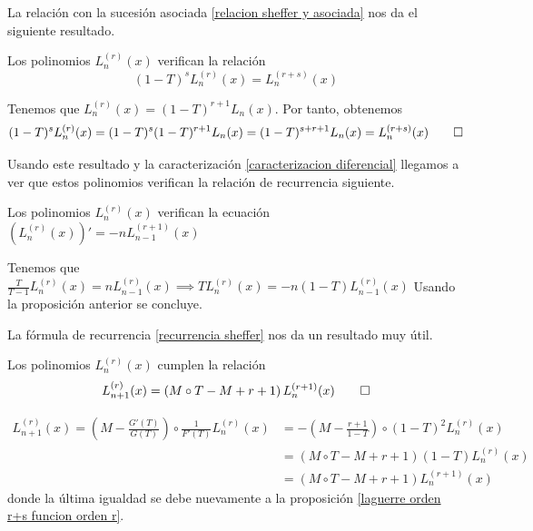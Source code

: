 La relación con la sucesión asociada \ref{relacion sheffer y asociada} nos da el siguiente resultado.

\begin{proposicion} \label{laguerre orden r+s funcion orden r}
    Los polinomios $L_n^{(r)}(x)$ verifican la relación \begin{equation*}
        (1-T)^s L_n^{(r)}(x) = L_n^{(r + s)}(x)
    \end{equation*}
\end{proposicion}

\begin{demo}
    Tenemos que $L_n^{(r)}(x) = (1-T)^{r+1} L_n(x)$. Por tanto, obtenemos
    \begin{equation*}
        (1-T)^s L_n^{(r)}(x) = (1-T)^s(1-T)^{r+1} L_n(x) = (1-T)^{s+r+1} L_n(x) = L_n^{(r + s)}(x) \qedhere
    \end{equation*}
\end{demo}

Usando este resultado y la caracterización \ref{caracterizacion diferencial} llegamos a ver que estos polinomios verifican la relación de recurrencia siguiente.

\begin{proposicion} \label{recurrencia diferencial laguerre}
    Los polinomios $L_n^{(r)}(x)$ verifican la ecuación $(L_n^{(r)}(x))' = -n L_{n-1}^{(r+1)}(x)$
\end{proposicion}

\begin{demo} Tenemos que $\frac{T}{T-1} L_n^{(r)}(x) = n L_{n-1}^{(r)}(x) \implies T L_n^{(r)}(x) = -n (1-T) L_{n-1}^{(r)}(x)$ Usando la proposición anterior se concluye.
\end{demo}

La fórmula de recurrencia \ref{recurrencia sheffer} nos da un resultado muy útil.

\begin{proposicion}
    Los polinomios $L_n^{(r)}(x)$ cumplen la relación
    \begin{equation*}
        L_{n+1}^{(r)}(x) = \left(M \circ T - M + r + 1\right)L_n^{(r+1)}(x) \qedhere
    \end{equation*}
\end{proposicion}

\begin{demo}
    \begin{align*}
        L_{n+1}^{(r)}(x) = \left(M - \frac{G'(T)}{G(T)}\right) \circ \frac{1}{F'(T)} L_n^{(r)}(x) & = -\left(M - \frac{r+1}{1-T}\right) \circ (1-T)^2 L_n^{(r)}(x) \\
        & = (M \circ T - M + r +1)(1-T) L_n^{(r)}(x) \\
        & = (M \circ T - M + r + 1)L_n^{(r+1)}(x)
    \end{align*}
    donde la última igualdad se debe nuevamente a la proposición \ref{laguerre orden r+s funcion orden r}.
\end{demo}

